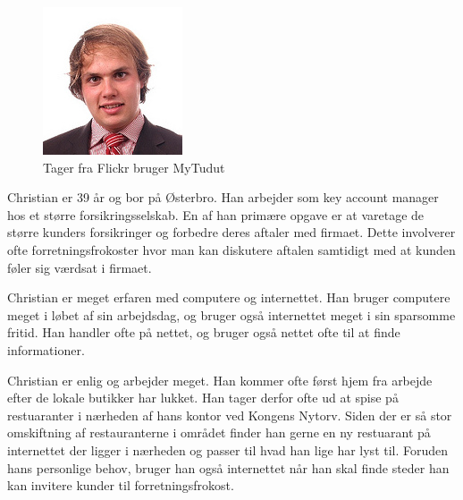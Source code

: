 \documentclass[a4paper, 12pt]{article}
\begin{document}
\begin{figure}
  \includegraphics[width=\linewidth]{christian}\\
  {\scriptsize Tager fra Flickr bruger MyTudut}
\end{figure}

Christian er 39 år og bor på Østerbro. Han arbejder som key account manager hos
et større forsikringsselskab. En af han primære opgave er at varetage de større
kunders forsikringer og forbedre deres aftaler med firmaet. Dette involverer
ofte forretningsfrokoster hvor man kan diskutere aftalen samtidigt med at kunden
føler sig værdsat i firmaet.

Christian er meget erfaren med computere og internettet. Han bruger computere
meget i løbet af sin arbejdsdag, og bruger også internettet meget i sin
sparsomme fritid. Han handler ofte på nettet, og bruger også nettet ofte til at
finde informationer. 

Christian er enlig og arbejder meget. Han kommer ofte først hjem fra arbejde
efter de lokale butikker har lukket. Han tager derfor ofte ud at spise på
restuaranter i nærheden af hans kontor ved Kongens Nytorv. Siden der er så stor
omskiftning af restauranterne i området finder han gerne en ny restuarant på
internettet der ligger i nærheden og passer til hvad han lige har lyst til.
Foruden hans personlige behov, bruger han også internettet når han skal finde
steder han kan invitere kunder til forretningsfrokost. 
\end{document}
